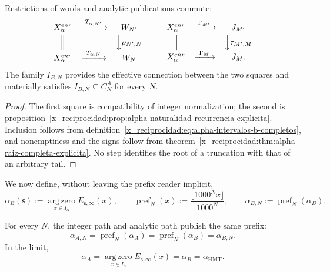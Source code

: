 \begin{proposition}
\label{x_reciprocidad:prop:alpha-cuadrados-compatibilidad}
Restrictions of words and analytic publications commute:
\[
\begin{array}{ccc}
 \mathcal X_\alpha^{\mathrm{enr}}&
 \xrightarrow{\ \mathsf T_{\alpha,N'}\ }&\mathcal W_{N'}\\[1mm]
 \Big\Vert&&\Big\downarrow\rho_{N',N}\\[1mm]
 \mathcal X_\alpha^{\mathrm{enr}}&
 \xrightarrow{\ \mathsf T_{\alpha,N}\ }&\mathcal W_N
\end{array}
\qquad
\begin{array}{ccc}
 \mathcal X_\alpha^{\mathrm{enr}}&
 \xrightarrow{\ \Gamma_{M'}\ }&\mathfrak J_{M'}\\[1mm]
 \Big\Vert&&\Big\downarrow\tau_{M',M}\\[1mm]
 \mathcal X_\alpha^{\mathrm{enr}}&
 \xrightarrow{\ \Gamma_M\ }&\mathfrak J_M .
\end{array}
\]
The family \(I_{B,N}\) provides the effective connection between the two
squares and materially satisfies
\(I_{B,N}\subseteq C_N^A\) for every \(N\).
\end{proposition}

\begin{proof}
The first square is compatibility of integer normalization; the second
is proposition~\ref{x_reciprocidad:prop:alpha-naturalidad-recurrencia-explicita}.
Inclusion follows from definition~\eqref{x_reciprocidad:eq:alpha-intervalos-b-completos},
and nonemptiness and the signs follow from
theorem~\ref{x_reciprocidad:thm:alpha-raiz-completa-explicita}. No step identifies the
root of a truncation with that of an arbitrary tail.
\end{proof}

We now define, without leaving the prefix reader implicit,
\begin{equation}
 \alpha_B(\mathsf s):=
 \operatorname*{arg\,zero}_{x\in I_\alpha}E_{\mathsf s,\infty}(x),
 \qquad
 \operatorname{pref}_N(x):=
 \frac{\lfloor1000^Nx\rfloor}{1000^N},
 \qquad
 \alpha_{B,N}:=\operatorname{pref}_N(\alpha_B).
 \label{x_reciprocidad:eq:alpha-definicion-b-y-prefijos-rev08}
\end{equation}

\begin{theorem}
\label{x_reciprocidad:thm:alpha-dos-publicaciones-completas}
For every \(N\), the integer path and analytic path publish the same prefix:
\begin{equation}
 \boxed{\alpha_{A,N}=\operatorname{pref}_N(\alpha_A)
 =\operatorname{pref}_N(\alpha_B)=\alpha_{B,N}.}
 \label{x_reciprocidad:eq:alpha-dos-vias-cada-nivel}
\end{equation}
In the limit,
\begin{equation}
 \boxed{\alpha_A
 =\operatorname*{arg\,zero}_{x\in I_\alpha}
       E_{\mathsf s,\infty}(x)
 =\alpha_B=\alpha_{\mathrm{HMT}}.}
 \label{x_reciprocidad:eq:alpha-dos-vias-limite-coinductivo}
\end{equation}
\end{theorem}


